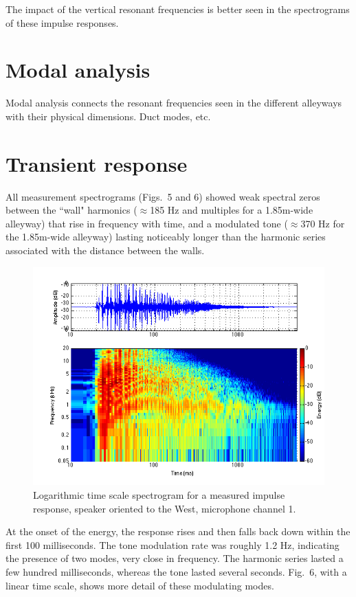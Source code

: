 \documentclass{aes137}
\begin{document}
The impact of the vertical resonant frequencies is better seen in the spectrograms of these impulse responses. %

\section{Modal analysis}
Modal analysis connects the resonant frequencies seen in the different alleyways with their physical dimensions. Duct modes, etc.

\section{Transient response}
All measurement spectrograms (Figs.~5 and 6) showed weak spectral
zeros between the ``wall" harmonics ($\approx$185 Hz and multiples for
a 1.85m-wide alleyway) that rise in frequency with time, and a
modulated tone ($\approx$370 Hz for the 1.85m-wide alleyway) lasting
noticeably longer than the harmonic series associated with the
distance between the walls.

\begin{figure}[h] \centering \includegraphics[width=\linewidth, trim=10mm 5mm 2mm 7mm, clip]{images/logspectrogram.png} \caption{Logarithmic time scale spectrogram for a measured impulse response, speaker oriented to the West, microphone channel 1.} \end{figure}

At the onset of the energy, the response rises and then falls back
down within the first 100 milliseconds. The tone modulation rate was
roughly 1.2 Hz, indicating the presence of two modes, very close in
frequency. The harmonic series lasted a few hundred milliseconds,
whereas the tone lasted several seconds. Fig.~6, with a linear time
scale, shows more detail of these modulating modes.
\end{document}
